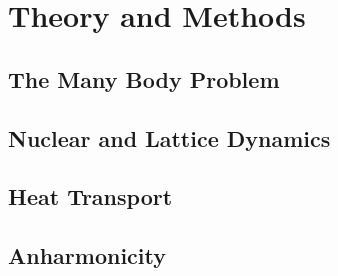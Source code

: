 \documentclass[nobib,a4paper,twoside,notoc,justified,marginals=justified]{tufte-book}
\newcommand{\blankpage}{\newpage\hbox{}\thispagestyle{empty}\newpage}
\begin{document}
  \frontmatter
  
%  

\tableofcontents





\cleardoublepage
{}
%

\mainmatter

\part{Theory and Methods}

\chapter{The Many Body Problem}



\chapter{Nuclear and Lattice Dynamics}


\chapter{Heat Transport}


\chapter{Anharmonicity}

\end{document}
